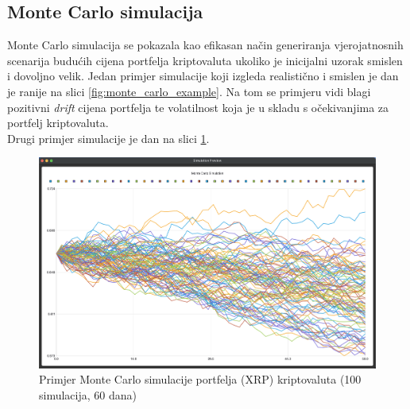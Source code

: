 \documentclass[zavrsnirad]{fer}
\begin{document}
\subsection{Monte Carlo simulacija}
\label{sek:monte_carlo_rezultati}
Monte Carlo simulacija se pokazala kao efikasan način
generiranja vjerojatnosnih scenarija budućih cijena portfelja kriptovaluta
ukoliko je inicijalni uzorak smislen i dovoljno velik.
Jedan primjer simulacije koji izgleda realistično i smislen je
dan je ranije na slici \ref{fig:monte_carlo_example}.
Na tom se primjeru vidi blagi pozitivni \textit{drift} cijena portfelja
te volatilnost koja je u skladu s očekivanjima za portfelj kriptovaluta.
\\
Drugi primjer simulacije je dan na slici \ref{fig:monte_carlo_example2}.
\begin{figure}[H]
    \centering
    \includegraphics[width=1.0\textwidth]{Figures/monte_carlo_example2.png}
    \caption{Primjer Monte Carlo simulacije portfelja (XRP) kriptovaluta (100
    simulacija, 60 dana)}
    \label{fig:monte_carlo_example2}
\end{figure}
\end{document}
